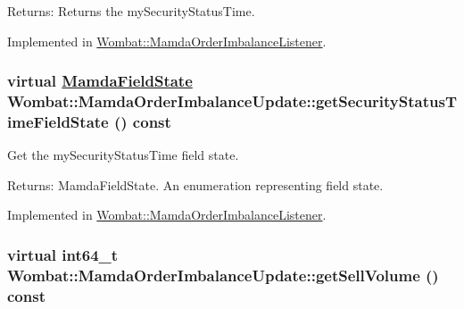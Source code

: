 \begin{Desc}
\item[Returns:]Returns the my\-Security\-Status\-Time. \end{Desc}


Implemented in \hyperlink{classWombat_1_1MamdaOrderImbalanceListener_1e72e1cbb405c48d7acab9ea19b3014e}{Wombat::Mamda\-Order\-Imbalance\-Listener}.\hypertarget{classWombat_1_1MamdaOrderImbalanceUpdate_155ddac9fba62e41837fc9e1485034a1}{
\subsubsection[getSecurityStatusTimeFieldState]{\setlength{\rightskip}{0pt plus 5cm}virtual \hyperlink{namespaceWombat_93aac974f2ab713554fd12a1fa3b7d2a}{Mamda\-Field\-State} Wombat::Mamda\-Order\-Imbalance\-Update::get\-Security\-Status\-Time\-Field\-State () const}}
\label{classWombat_1_1MamdaOrderImbalanceUpdate_155ddac9fba62e41837fc9e1485034a1}


Get the my\-Security\-Status\-Time field state. 

\begin{Desc}
\item[Returns:]Mamda\-Field\-State. An enumeration representing field state. \end{Desc}


Implemented in \hyperlink{classWombat_1_1MamdaOrderImbalanceListener_7588daaf6700cd13510c480612e19fe0}{Wombat::Mamda\-Order\-Imbalance\-Listener}.\hypertarget{classWombat_1_1MamdaOrderImbalanceUpdate_060e24ad3311afc17474b38cfebaeb9f}{
\subsubsection[getSellVolume]{\setlength{\rightskip}{0pt plus 5cm}virtual int64\_\-t Wombat::Mamda\-Order\-Imbalance\-Update::get\-Sell\-Volume () const}}
\label{classWombat_1_1MamdaOrderImbalanceUpdate_060e24ad3311afc17474b38cfebaeb9f}


